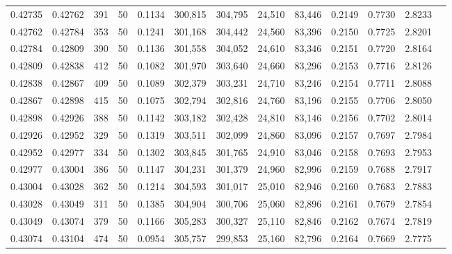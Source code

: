 \begin{tabular}{rrrrrrrrrrrrr}
0.42735 & 0.42762 &   391 &  50 &                                     0.1134 & 300,815 & 304,795 &  24,510 &  83,446 & 0.2149 & 0.7730 & 2.8233 \\
0.42762 & 0.42784 &   353 &  50 &                                     0.1241 & 301,168 & 304,442 &  24,560 &  83,396 & 0.2150 & 0.7725 & 2.8201 \\
0.42784 & 0.42809 &   390 &  50 &                                     0.1136 & 301,558 & 304,052 &  24,610 &  83,346 & 0.2151 & 0.7720 & 2.8164 \\
0.42809 & 0.42838 &   412 &  50 &                                     0.1082 & 301,970 & 303,640 &  24,660 &  83,296 & 0.2153 & 0.7716 & 2.8126 \\
0.42838 & 0.42867 &   409 &  50 &                                     0.1089 & 302,379 & 303,231 &  24,710 &  83,246 & 0.2154 & 0.7711 & 2.8088 \\
0.42867 & 0.42898 &   415 &  50 &                                     0.1075 & 302,794 & 302,816 &  24,760 &  83,196 & 0.2155 & 0.7706 & 2.8050 \\
0.42898 & 0.42926 &   388 &  50 &                                     0.1142 & 303,182 & 302,428 &  24,810 &  83,146 & 0.2156 & 0.7702 & 2.8014 \\
0.42926 & 0.42952 &   329 &  50 &                                     0.1319 & 303,511 & 302,099 &  24,860 &  83,096 & 0.2157 & 0.7697 & 2.7984 \\
0.42952 & 0.42977 &   334 &  50 &                                     0.1302 & 303,845 & 301,765 &  24,910 &  83,046 & 0.2158 & 0.7693 & 2.7953 \\
0.42977 & 0.43004 &   386 &  50 &                                     0.1147 & 304,231 & 301,379 &  24,960 &  82,996 & 0.2159 & 0.7688 & 2.7917 \\
0.43004 & 0.43028 &   362 &  50 &                                     0.1214 & 304,593 & 301,017 &  25,010 &  82,946 & 0.2160 & 0.7683 & 2.7883 \\
0.43028 & 0.43049 &   311 &  50 &                                     0.1385 & 304,904 & 300,706 &  25,060 &  82,896 & 0.2161 & 0.7679 & 2.7854 \\
0.43049 & 0.43074 &   379 &  50 &                                     0.1166 & 305,283 & 300,327 &  25,110 &  82,846 & 0.2162 & 0.7674 & 2.7819 \\
0.43074 & 0.43104 &   474 &  50 &                                     0.0954 & 305,757 & 299,853 &  25,160 &  82,796 & 0.2164 & 0.7669 & 2.7775 \\

\end{tabular}
